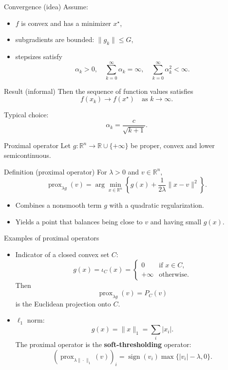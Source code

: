 \documentclass[aspectratio=169]{beamer}
\begin{document}
\begin{frame}{Convergence (idea)}
Assume:
\begin{itemize}
    \item $f$ is convex and has a minimizer $x^\star$,
    \item subgradients are bounded: $\|g_k\|\le G$,
    \item stepsizes satisfy
    \[
    \alpha_k >0,\quad \sum_{k=0}^\infty \alpha_k = \infty,\quad
    \sum_{k=0}^\infty \alpha_k^2 < \infty.
    \]
\end{itemize}
\pause
\begin{block}{Result (informal)}
Then the sequence of function values satisfies
\[
f(x_k) \to f(x^\star) \quad \text{as } k\to\infty.
\]
\end{block}
\pause
Typical choice:
\[
\alpha_k = \frac{c}{\sqrt{k+1}}.
\]
\end{frame}


\begin{frame}{Proximal operator}
Let $g:\mathbb{R}^n\to\mathbb{R}\cup\{+\infty\}$ be proper, convex and lower semicontinuous.
\pause
\begin{block}{Definition (proximal operator)}
For $\lambda>0$ and $v\in\mathbb{R}^n$,
\[
\operatorname{prox}_{\lambda g}(v)
=
\arg\min_{x\in\mathbb{R}^n}
\left\{
g(x) + \frac{1}{2\lambda}\|x - v\|^2
\right\}.
\]
\end{block}
\pause
\begin{itemize}
    \item Combines a nonsmooth term $g$ with a quadratic regularization.
    \item Yields a point that balances being close to $v$ and having small $g(x)$.
\end{itemize}
\pause
\end{frame}

\begin{frame}{Examples of proximal operators}
\begin{itemize}
    \item Indicator of a closed convex set $C$:
    \[
    g(x) = \iota_C(x) =
    \begin{cases}
       0 & \text{if } x\in C,\\
       +\infty & \text{otherwise}.
    \end{cases}
    \]
    \pause
    Then
    \[
    \operatorname{prox}_{\lambda g}(v) = P_C(v)
    \]
    is the Euclidean projection onto $C$.
    \pause
    \item $\ell_1$ norm:
    \[
    g(x)=\|x\|_1 = \sum_i |x_i|.
    \]
    The proximal operator is the \textbf{soft-thresholding} operator:
    \[
    (\operatorname{prox}_{\lambda \|\cdot\|_1}(v))_i
    = \operatorname{sign}(v_i)\max\{|v_i| - \lambda,0\}.
    \]
\end{itemize}
\end{frame}
\end{document}
